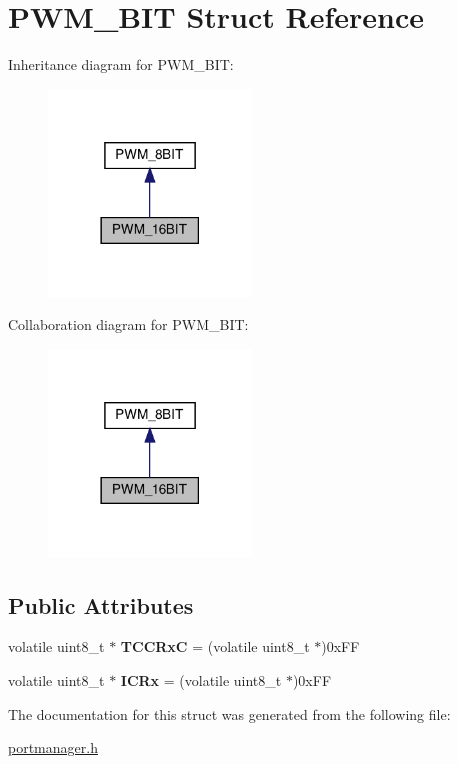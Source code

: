 \hypertarget{structPWM__16BIT}{}\section{P\+W\+M\+\_\+B\+IT Struct Reference}
\label{structPWM__16BIT}


Inheritance diagram for P\+W\+M\+\_\+B\+IT\+:\nopagebreak
\begin{figure}[H]
\begin{center}
\leavevmode
\includegraphics[width=153pt]{structPWM__16BIT__inherit__graph}
\end{center}
\end{figure}


Collaboration diagram for P\+W\+M\+\_\+B\+IT\+:\nopagebreak
\begin{figure}[H]
\begin{center}
\leavevmode
\includegraphics[width=153pt]{structPWM__16BIT__coll__graph}
\end{center}
\end{figure}
\subsection*{Public Attributes}
\begin{DoxyCompactItemize}
\item 
\mbox{\label{structPWM__16BIT_aed58d52d5a361e85b19d584d9b59f1b9}} 
volatile uint8\+\_\+t $\ast$ {\bfseries T\+C\+C\+RxC} = (volatile uint8\+\_\+t $\ast$)0x\+FF
\item 
\mbox{\label{structPWM__16BIT_a6e5ea7c07d0fa0f6970bbfe9c2a11677}} 
volatile uint8\+\_\+t $\ast$ {\bfseries I\+C\+Rx} = (volatile uint8\+\_\+t $\ast$)0x\+FF
\end{DoxyCompactItemize}


The documentation for this struct was generated from the following file\+:\begin{DoxyCompactItemize}
\item 
\hyperlink{portmanager_8h}{portmanager.\+h}\end{DoxyCompactItemize}
